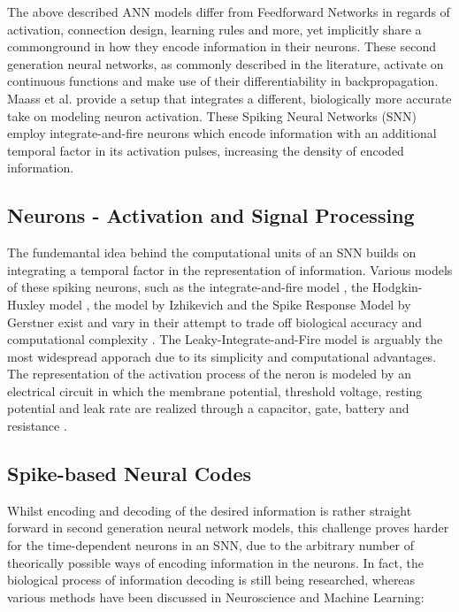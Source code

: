 \documentclass[letterpaper, 10 pt, conference]{ieeeconf}  %
\begin{document}
The above described ANN models differ from Feedforward Networks in regards of activation, connection design, learning rules and more, yet implicitly
share a commonground in how they encode information in their neurons. These second generation neural networks, as commonly described in the literature,
activate on continuous functions and make use of their differentiability in backpropagation. Maass et al. \cite{maassNetworksSpikingNeurons1997} 
provide a setup that
integrates a different, biologically more accurate take on modeling neuron activation. These Spiking Neural Networks (SNN) employ
integrate-and-fire neurons \cite{maassNetworksSpikingNeurons} which encode information with an additional temporal factor in its activation pulses, increasing
the density of encoded information.  

\subsection{Neurons - Activation and Signal Processing} 

The fundemantal idea behind the computational units of an SNN builds on integrating a temporal factor 
in the representation of information. Various models of these spiking neurons, such as the integrate-and-fire model
 \cite{abbottLapicqueIntroductionIntegrateandfire1999}, 
the Hodgkin-Huxley model \cite{hodgkinQuantitativeDescriptionMembrane1952}, the model by Izhikevich \cite{izhikevichSimpleModelSpiking2003}
and the Spike Response Model by Gerstner \cite{gerstnerSpikeresponseModel2008}
exist and vary in their attempt to trade off biological accuracy and computational complexity \cite{gruningSpikingNeuralNetworks2014}.
The Leaky-Integrate-and-Fire model is arguably the most widespread apporach due to its simplicity and computational advantages. 
The representation of the activation process of the neron is modeled by an electrical circuit in which the membrane potential, threshold voltage,
resting potential and leak rate are realized through a capacitor, gate, battery and resistance
\cite{abbottLapicqueIntroductionIntegrateandfire1999}\cite{ponulakIntroductionSpikingNeural2011}.
\subsection{Spike-based Neural Codes}

Whilst encoding and decoding of the desired information is rather straight forward in second generation neural network models,
this challenge proves harder for the time-dependent neurons in an SNN, due to the arbitrary 
number of theorically possible ways of encoding information in the neurons. In fact, the biological process of information decoding is 
still being researched, whereas various methods have been discussed in Neuroscience and Machine Learning:
\end{document}
